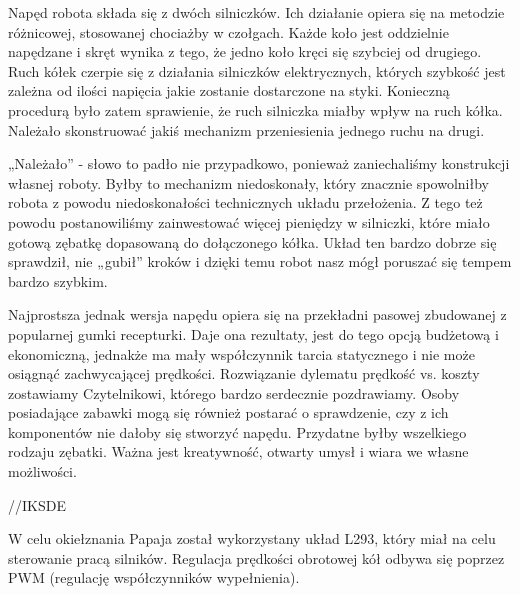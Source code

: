 Napęd robota składa się z dwóch silniczków. Ich działanie opiera się na metodzie różnicowej, stosowanej chociażby w czołgach. Każde koło jest oddzielnie napędzane i skręt wynika z tego, że jedno koło kręci się szybciej od drugiego. Ruch kółek czerpie się z działania silniczków elektrycznych, których szybkość jest zależna od ilości napięcia jakie zostanie dostarczone na styki. Konieczną procedurą było zatem sprawienie, że ruch silniczka miałby wpływ na ruch kółka. Należało skonstruować jakiś mechanizm przeniesienia jednego ruchu na drugi. 

„Należało” - słowo to padło nie przypadkowo, ponieważ zaniechaliśmy konstrukcji własnej roboty. Byłby to mechanizm niedoskonały, który znacznie spowolniłby robota z powodu niedoskonałości technicznych układu przełożenia. Z tego też powodu postanowiliśmy zainwestować więcej pieniędzy w silniczki, które miało gotową zębatkę dopasowaną do dołączonego kółka. Układ ten bardzo dobrze się sprawdził, nie „gubił” kroków i dzięki temu robot nasz mógł poruszać się tempem bardzo szybkim.

Najprostsza jednak wersja napędu opiera się na przekładni pasowej zbudowanej z popularnej gumki recepturki. Daje ona rezultaty, jest do tego opcją budżetową i ekonomiczną, jednakże ma mały współczynnik tarcia statycznego i nie może osiągnąć zachwycającej prędkości. Rozwiązanie dylematu prędkość vs. koszty zostawiamy Czytelnikowi, którego bardzo serdecznie pozdrawiamy. Osoby posiadające zabawki mogą się również postarać o sprawdzenie, czy z ich komponentów nie dałoby się stworzyć napędu. Przydatne byłby wszelkiego rodzaju zębatki. Ważna jest kreatywność, otwarty umysł i wiara we własne możliwości. 

//IKSDE


W celu okiełznania Papaja został wykorzystany układ L293, który miał na celu sterowanie pracą silników. Regulacja prędkości obrotowej kół odbywa się poprzez PWM (regulację współczynników wypełnienia).
